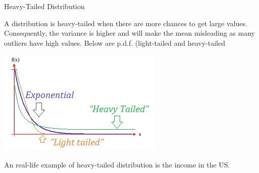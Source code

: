 Heavy-Tailed Distribution

A distribution is heavy-tailed when there are more chances to get large values. Consequently, the variance is higher and will make the mean misleading as many outliers have high values. Below are p.d.f. (light-tailed and heavy-tailed

\vspace{5mm}

\begin{center}
\includegraphics[scale=0.8]{heavy-light-tailed.png}
\end{center}

An real-life example of heavy-tailed distribution is the income in the US.

\vspace{5mm}